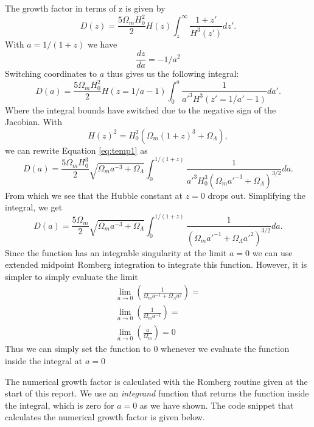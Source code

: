 The growth factor in terms of z is given by
\begin{equation}
D(z) = \frac{5\Omega_m H_0^2}{2} H(z) \int_z^\infty \frac{1+z'}{H^3(z')} dz'.
\end{equation}
With $a = 1/(1+z)$ we have 
\begin{equation}
\frac{dz}{da} = -1/a^2
\end{equation}
Switching coordinates to $a$ thus gives us the following integral:
\begin{equation}\label{eq:temp1}
D(a) = \frac{5\Omega_m H_0^2}{2} H(z=1/a-1) \int_0^{a} \frac{1}{a'^{3} H^3(z'=1/a'-1)} da'.
\end{equation}
Where the integral bounds have switched due to the negative sign of the Jacobian. 
With 
\begin{equation}
H(z)^2 = H_0^2 \left(\Omega_m(1+z)^3+\Omega_\Lambda \right),
\end{equation}
we can rewrite Equation \ref{eq:temp1} as
\begin{equation}
D(a) = \frac{5\Omega_m H_0^3}{2} \sqrt{\Omega_m a^{-3}+\Omega_\Lambda} \int_0^{1/(1+z)} \frac{1}{a'^{3} H_0^3 \left(\Omega_m a'^{-3} +\Omega_\Lambda\right)^{3/2}} da.
\end{equation}
From which we see that the Hubble constant at $z=0$ drops out. Simplifying the integral, we get
\begin{equation}
D(a) = \frac{5\Omega_m}{2} \sqrt{\Omega_m a^{-3}+\Omega_\Lambda} \int_0^{1/(1+z)} \frac{1}{\left(\Omega_m a'^{-1} +\Omega_\Lambda a'^2 \right)^{3/2}} da.
\end{equation}
Since the function has an integrable singularity at the limit $a=0$ we can use extended midpoint Romberg integration to integrate this function. However, it is simpler to simply evaluate the limit
\begin{equation}
\begin{split}
\lim_{a \to 0} \left( \frac{1}{\Omega_m a^{-1} + \Omega_\Lambda a^2} \right) = \\
\lim_{a \to 0} \left( \frac{1}{\Omega_m a^{-1}} \right) = \\
\lim_{a \to 0} \left( \frac{a}{\Omega_m} \right) = 0
\end{split}
\end{equation}
Thus we can simply set the function to 0 whenever we evaluate the function inside the integral at $a=0$

The numerical growth factor is calculated with the Romberg routine given at the start of this report. We use an \textit{integrand} function that returns the function inside the integral, which is zero for $a=0$ as we have shown. The code snippet that calculates the numerical growth factor is given below.

